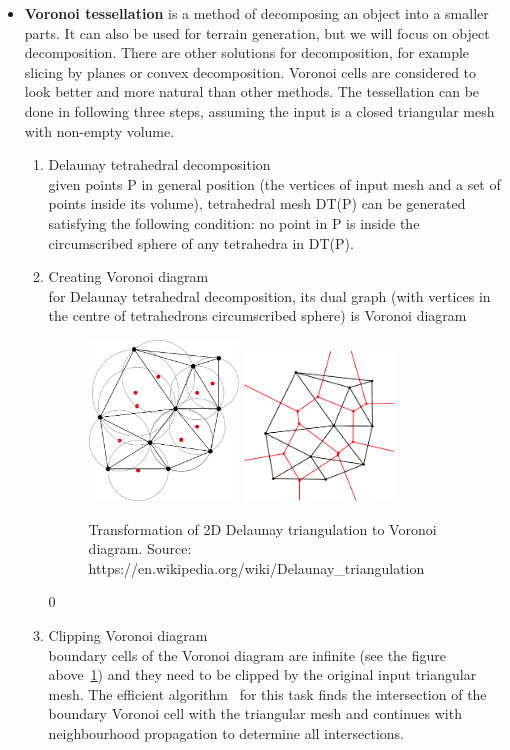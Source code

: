 \begin{itemize}
\item \textbf{Voronoi tessellation} is a method of decomposing an object into a smaller parts. It can also be used for terrain generation, but we will focus on object decomposition. There are other solutions for decomposition, for example slicing by planes or convex decomposition. Voronoi cells are considered to look better and more natural than other methods. The tessellation can be done in following three steps, assuming the input is a closed triangular mesh with non-empty volume.
\begin{enumerate}
    \item Delaunay tetrahedral decomposition \\ given points P in general position (the vertices of input mesh and a set of points inside its volume), tetrahedral mesh DT(P) can be generated satisfying the following condition: no point in P is inside the circumscribed sphere of any tetrahedra in DT(P).
    \item Creating Voronoi diagram \\ for Delaunay tetrahedral decomposition, its dual graph (with vertices in the centre of tetrahedrons circumscribed sphere) is Voronoi diagram
    \begin{figure}[ht!]
        \centering
        \includegraphics[width=0.4\textwidth]{img/delaunay}
        \includegraphics[width=0.4\textwidth]{img/voronoi}
        \caption{Transformation of 2D Delaunay triangulation to Voronoi diagram. Source: https://en.wikipedia.org/wiki/Delaunay\_triangulation}
        \label{DT}
    \end{figure}0
    \item Clipping Voronoi diagram \\ boundary cells of the Voronoi diagram are infinite (see the figure above~\ref{DT}) and they need to be clipped by the original input triangular mesh. The efficient algorithm~\cite{yan2010efficient} for this task finds the intersection of the boundary Voronoi cell with the triangular mesh and continues with neighbourhood propagation to determine all intersections. 
\end{enumerate}


\end{itemize}
